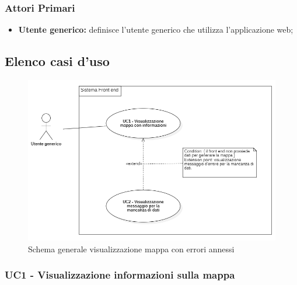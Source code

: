 \subsubsection{Attori Primari}\label{CasiDUsoCasiDUsoTraUnUtenteEIlFrontEndAttoriDeiCasiDUsoAttoriPrimari}
\begin{itemize}
	\item \textbf{Utente generico:} definisce l'utente generico che utilizza l'applicazione web;
\end{itemize}

\subsection{Elenco casi d'uso}\label{CasiDUsoCasiDUsoTraUnUtenteEIlFrontEndElencoCasiDUso}

\begin{center}
	\begin{figure}[H]
		\centering\includegraphics[scale=0.8]{../immagini/attori_casi/uc1_uc2.png}
		\caption{Schema generale visualizzazione mappa con errori annessi}
	\end{figure}
\end{center}

\subsubsection{UC1 - Visualizzazione informazioni sulla mappa}\label{CasiDUsoCasiDUsoTraUnUtenteEIlFrontEndElencoCasiDUsoUC1VisualizzazioneInformazioniSullaMappa} %


